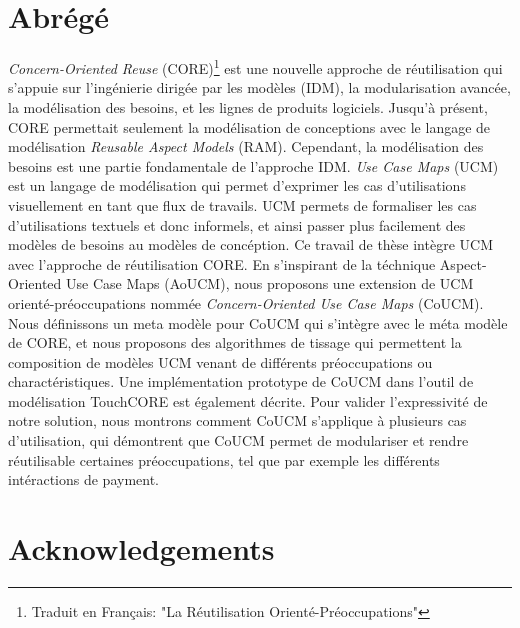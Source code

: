 \documentclass[12pt,letterpaper]{report}
\begin{document}
	\clearpage
	
	\chapter*{Abrégé}
	
	\emph{Concern-Oriented Reuse} (CORE)\footnote{Traduit en Fran{\c c}ais: "La R{\'e}utilisation Orient{\'e}-Pr{\'e}occupations"} est une nouvelle approche de r{\'e}utilisation qui s'appuie sur l'ing{\'e}nierie dirig{\'e}e par les mod{\`e}les (IDM), la modularisation avanc{\'e}e, la mod{\'e}lisation des besoins, et les lignes de produits logiciels. Jusqu'{\`a} pr{\'e}sent, CORE permettait seulement la mod{\'e}lisation de conceptions avec le langage de mod{\'e}lisation \emph{Reusable Aspect Models} (RAM). Cependant, la mod{\'e}lisation des besoins est une partie fondamentale de l'approche IDM. \emph{Use Case Maps} (UCM) est un langage de mod{\'e}lisation qui permet d'exprimer les cas d'utilisations visuellement en tant que flux de travails. UCM permets de formaliser les cas d'utilisations textuels et donc informels, et ainsi passer plus facilement des mod{\`e}les de besoins au mod{\`e}les de conc{\'e}ption. Ce travail de th{\`e}se int{\`e}gre UCM avec l'approche de r{\'e}utilisation CORE. En s'inspirant de la t{\'e}chnique Aspect-Oriented Use Case Maps (AoUCM), nous proposons une extension de UCM orient{\'e}-pr{\'e}occupations nomm{\'e}e \emph{Concern-Oriented Use Case Maps} (CoUCM). Nous d{\'e}finissons un meta mod{\`e}le pour CoUCM qui s'int{\`e}gre avec le m{\'e}ta mod{\`e}le de CORE, et nous proposons des algorithmes de tissage qui permettent la composition de mod{\`e}les UCM venant de diff{\'e}rents pr{\'e}occupations ou charact{\'e}ristiques. Une impl{\'e}mentation prototype de CoUCM dans l'outil de mod{\'e}lisation TouchCORE est {\'e}galement d{\'e}crite. Pour valider l'expressivit{\'e} de notre solution, nous montrons comment CoUCM s'applique {\`a} plusieurs cas d'utilisation, qui d{\'e}montrent que CoUCM permet de modulariser et rendre r{\'e}utilisable certaines pr{\'e}occupations, tel que par exemple les diff{\'e}rents int{\'e}ractions de payment.	
	
	\clearpage
	
	\chapter*{Acknowledgements}
	
\end{document}
